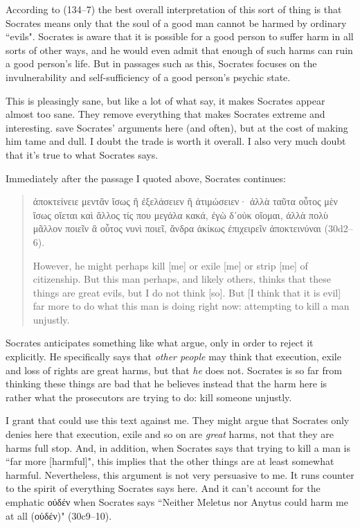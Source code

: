 \documentclass[11pt]{article}
\begin{document}
According to \citet{brickhouse2004} (134--7) the best overall
interpretation of this sort of thing is that Socrates means only that the
soul of a good man cannot be harmed by ordinary ``evils".  Socrates is
aware that it is possible for a good person to suffer harm in all sorts of
other ways, and he would even admit that enough of such harms can ruin
a good person's life.  But in passages such as this, Socrates focuses on
the invulnerability and self-sufficiency of a good person's psychic state.

This is pleasingly sane, but like a lot of what \citeauthor{brickhouse2004}
say, it makes Socrates appear almost too sane.  They remove everything that
makes Socrates extreme and interesting.  \citeauthor{brickhouse2004} save
Socrates' arguments here (and often), but at the cost of making him tame
and dull.  I doubt the trade is worth it overall.  I also very much doubt
that it's true to what Socrates says.

Immediately after the passage I quoted above, Socrates continues:

\begin{quote}

    {\g
    ἀποκτείνειε μεντἂν ἴσως ἢ ἐξελάσειεν ἢ ἀτιμώσειεν· ἀλλὰ ταῦτα οὗτος μὲν
    ἴσως οἴεται καὶ ἄλλος τίς που μεγάλα κακά, ἐγὼ δ᾽οὐκ οἴομαι, ἀλλὰ πολὺ
    μᾶλλον ποιεῖν ἃ οὗτος νυνὶ ποιεῖ, ἄνδρα ἀκίκως ἐπιχειρεῖν ἀποκτεινύναι
    } (30d2--6).

    However, he might perhaps kill [me] or exile [me] or strip [me] of
    citizenship. But this man perhaps, and likely others, thinks that these
    things are great evils, but I do not think [so]. But [I think that it
    is evil] far more to do what this man is doing right now: attempting to
    kill a man unjustly.

\end{quote}

Socrates anticipates something like what \citeauthor{brickhouse2004} argue,
only in order to reject it explicitly.  He specifically says that
\emph{other people} may think that execution, exile and loss of rights are
great harms, but that \emph{he} does not.  Socrates is so far from thinking
these things are bad that he believes instead that the harm here is rather
what the prosecutors are trying to do: kill someone unjustly.

I grant that \citeauthor{brickhouse2004} could use this text against me.
They might argue that Socrates only denies here that execution, exile and
so on are \emph{great} harms, not that they are harms full stop.  And, in
addition, when Socrates says that trying to kill a man is ``far more
[harmful]", this implies that the other things are at least somewhat
harmful.  Nevertheless, this argument is not very persuasive to me.  It
runs counter to the spirit of everything Socrates says here. And it can't
account for the emphatic {\g οὐδέν} when Socrates says ``Neither Meletus
nor Anytus could harm me at all ({\g οὐδέν})" (30c9--10).
\end{document}

